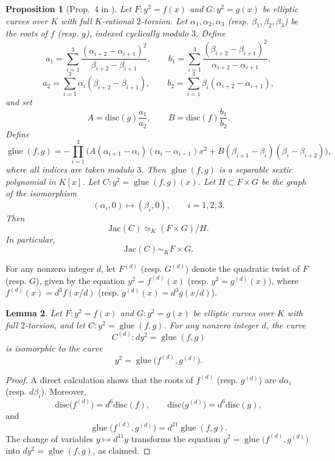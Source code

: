 \documentclass{amsart}
\newcommand{\Jac}{\mathrm{Jac}}
\newcommand{\disc}{\mathrm{disc}}
\DeclareMathOperator{\glue}{\mathrm{glue}}
\newtheorem{proposition}{Proposition}[section]
\newtheorem{lemma}[proposition]{Lemma}
\begin{document}
\begin{proposition}[Prop.~4 in \cite{HoweLeprevostPoonen2000}]\label{prop:gluing}
Let $F\colon y^{2}=f(x)$ and $G\colon y^{2}=g(x)$ be elliptic curves over $K$ with full $K$-rational $2$-torsion.
Let $\alpha_1,\alpha_2,\alpha_3$ (resp. $\beta_1,\beta_2,\beta_3$) be the roots of $f$ (resp. $g$),
indexed cyclically modulo $3$. Define
\[
a_1=\sum_{i=1}^3 \frac{(\alpha_{i+2}-\alpha_{i+1})^2}{\beta_{i+2}-\beta_{i+1}}, \qquad
b_1=\sum_{i=1}^3 \frac{(\beta_{i+2}-\beta_{i+1})^2}{\alpha_{i+2}-\alpha_{i+1}},
\]
\[
a_2=\sum_{i=1}^3 \alpha_i(\beta_{i+2}-\beta_{i+1}), \qquad
b_2=\sum_{i=1}^3 \beta_i(\alpha_{i+2}-\alpha_{i+1}),
\]
and set
\[
A=\disc(g)\frac{a_1}{a_2}, \qquad
B=\disc(f)\frac{b_1}{b_2}.
\]
Define
\[
\glue(f,g)
=
-\prod_{i=1}^3
\bigl(
A(\alpha_{i+1}-\alpha_i)(\alpha_i-\alpha_{i-1})x^2
+
B(\beta_{i+1}-\beta_i)(\beta_i-\beta_{i+2})
\bigr),
\]
where all indices are taken modulo $3$. Then $\glue(f,g)$ is a separable sextic polynomial in $K[x]$.
Let $C\colon y^2=\glue(f,g)(x)$. Let \(H\subset F\times G\) be the graph of the isomorphism
\[
(\alpha_i,0)\longmapsto (\beta_i,0), \qquad i=1,2,3.
\]
Then
\[
\Jac(C)\simeq_K (F\times G)/H.
\]
In particular,
\[
\Jac(C)\sim_K F\times G.
\]
\end{proposition}

For any nonzero integer $d$, let $F^{(d)}$ (resp. $G^{(d)}$) denote the quadratic twist of $F$
(resp. $G$), given by the equation $y^{2}=f^{(d)}(x)$ (resp. $y^{2}=g^{(d)}(x)$), where
$f^{(d)}(x)=d^{3}f(x/d)$ (resp. $g^{(d)}(x)=d^{3}g(x/d)$).

\begin{lemma} \label{gluelemma}
Let $F\colon y^{2}=f(x)$ and $G\colon y^{2}=g(x)$ be elliptic curves over $K$ with full $2$-torsion,
and let $C\colon y^{2}=\glue(f,g)$. For any nonzero integer $d$, the curve
\[
C^{(d)}\colon dy^{2}=\glue(f,g)
\]
is isomorphic to the curve
\[
y^{2}=\glue\bigl(f^{(d)},g^{(d)}\bigr).
\]
\end{lemma}


\begin{proof}
A direct calculation shows that the roots of $f^{(d)}$ (resp. $g^{(d)}$) are $d\alpha_i$
(resp. $d\beta_i$). Moreover,
\[
\disc\bigl(f^{(d)}\bigr)=d^{6}\disc(f), \qquad
\disc\bigl(g^{(d)}\bigr)=d^{6}\disc(g),
\]
and
\[
\glue\bigl(f^{(d)},g^{(d)}\bigr)=d^{21}\glue(f,g).
\]
The change of variables $y\mapsto d^{11}y$ transforms the equation
$y^{2}=\glue\bigl(f^{(d)},g^{(d)}\bigr)$ into $dy^{2}=\glue(f,g)$, as claimed.
\end{proof}
\end{document}
